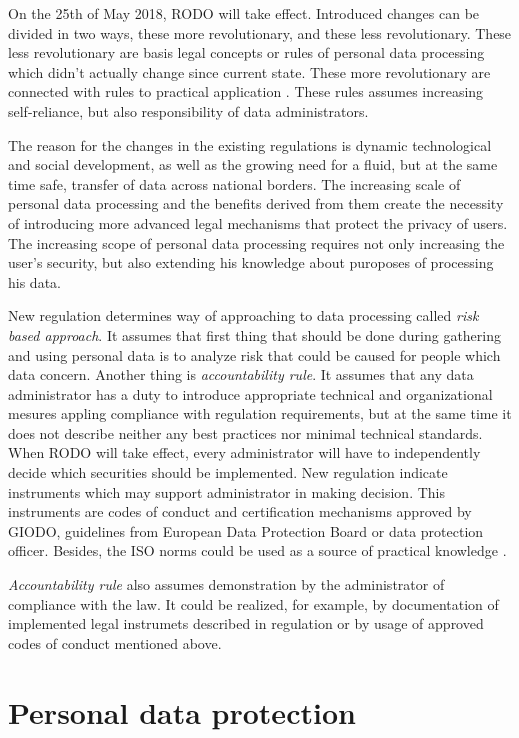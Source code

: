 \documentclass[en, noamssymb]{mgr}
\begin{document}
On the 25th of May 2018, RODO will take effect. Introduced changes can be divided in two ways, these more revolutionary, and these less revolutionary. These less revolutionary are basis legal concepts or rules of personal data processing which didn't actually change since current state. These more revolutionary are connected with rules to practical application \cite{giodo}. These rules assumes increasing self-reliance, but also responsibility of data administrators.

\indent The reason for the changes in the existing 	regulations is dynamic technological and social development, as well as the growing need for a fluid, but at the same time safe, transfer of data across national borders. The increasing scale of personal data processing and the benefits derived from them create the necessity of introducing more advanced legal mechanisms that protect the privacy of users. The increasing scope of personal data processing requires not only increasing the user's security, but also extending his knowledge about puroposes of processing his data.

\indent New regulation determines way of approaching to data processing called \textit{risk based approach}. It assumes that first thing that should be done during gathering and using personal data is to analyze risk that could be caused for people which data concern. Another thing is \textit{accountability rule}. It assumes that any data administrator has a duty to introduce appropriate technical and organizational mesures appling compliance with regulation requirements, but at the same time it does not describe neither any best practices nor minimal technical standards. When RODO will take effect, every administrator will have to independently decide which securities should be implemented. New regulation indicate instruments which may support administrator in making decision. This instruments are codes of conduct and certification mechanisms approved by GIODO, guidelines from European Data Protection Board or data protection officer. Besides, the ISO norms could be used as a source of practical knowledge \cite{giodo}.

\indent \textit{Accountability rule} also assumes demonstration by the administrator of compliance with the law. It could be realized, for example, by documentation of implemented legal instrumets described in regulation or by usage of approved codes of conduct mentioned above.


\chapter{Personal data protection} \label{sec:sekcjaDaneOsobowe}
\end{document}

